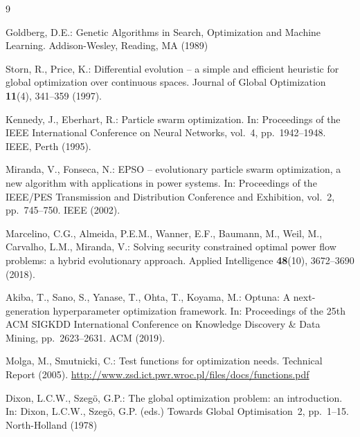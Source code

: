 \documentclass[runningheads]{llncs}
\begin{document}
\begin{thebibliography}{9}

Goldberg, D.E.: Genetic Algorithms in Search, Optimization and
Machine Learning. Addison-Wesley, Reading, MA (1989)

Storn, R., Price, K.: Differential evolution -- a simple and efficient
heuristic for global optimization over continuous spaces.
Journal of Global Optimization \textbf{11}(4), 341--359 (1997).

Kennedy, J., Eberhart, R.: Particle swarm optimization.
In: Proceedings of the IEEE International Conference on Neural
Networks, vol.~4, pp.~1942--1948. IEEE, Perth (1995).

Miranda, V., Fonseca, N.: EPSO -- evolutionary particle swarm
optimization, a new algorithm with applications in power systems.
In: Proceedings of the IEEE/PES Transmission and Distribution
Conference and Exhibition, vol.~2, pp.~745--750. IEEE (2002).

Marcelino, C.G., Almeida, P.E.M., Wanner, E.F., Baumann, M.,
Weil, M., Carvalho, L.M., Miranda, V.: Solving security constrained
optimal power flow problems: a hybrid evolutionary approach.
Applied Intelligence \textbf{48}(10), 3672--3690 (2018).

Akiba, T., Sano, S., Yanase, T., Ohta, T., Koyama, M.:
Optuna: A next-generation hyperparameter optimization framework.
In: Proceedings of the 25th ACM SIGKDD International Conference on
Knowledge Discovery \& Data Mining, pp.~2623--2631. ACM (2019).

Molga, M., Smutnicki, C.: Test functions for optimization needs.
Technical Report (2005).
\url{http://www.zsd.ict.pwr.wroc.pl/files/docs/functions.pdf}

Dixon, L.C.W., Szeg\"{o}, G.P.: The global optimization problem:
an introduction. In: Dixon, L.C.W., Szeg\"{o}, G.P. (eds.)
Towards Global Optimisation~2, pp.~1--15. North-Holland (1978)

\end{thebibliography}
\end{document}
